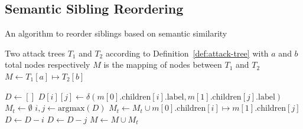 \subsection{Semantic Sibling Reordering}
\begin{algorithm}
    \caption{An algorithm to reorder siblings based on semantic similarity}
    \label{alg:sibling_reorder}
    \begin{algorithmic}
        \State Two attack trees $T_1$ and $T_2$ according to Definition~\ref{def:attack-tree} with $a$ and $b$ total nodes respectively
        \State $M$ is the mapping of nodes between $T_1$ and $T_2$ 
        \State $M \gets T_1[a]\mapsto T_2[b]$

        \State $D \gets []$ 
                \State $D[i][j] \gets \delta(m[0].\text{children}[i].\text{label}, m[1].\text{children}[j].\text{label})$
            \EndFor
        \EndFor
        \State $M_t \gets \emptyset$  
            \State $i, j \gets \text{argmax}(D)$ 
            \State $M_t \gets M_t \cup m[0].\text{children}[i]\mapsto m[1].\text{children}[j]$
            \State $D \gets D - i$ 
            \State $D \gets D - j$ 
        \EndWhile
            \EndIf
        \EndFor
        \State $M \gets M \cup M_t$
        \EndFor
    \end{algorithmic}
    \end{algorithm}